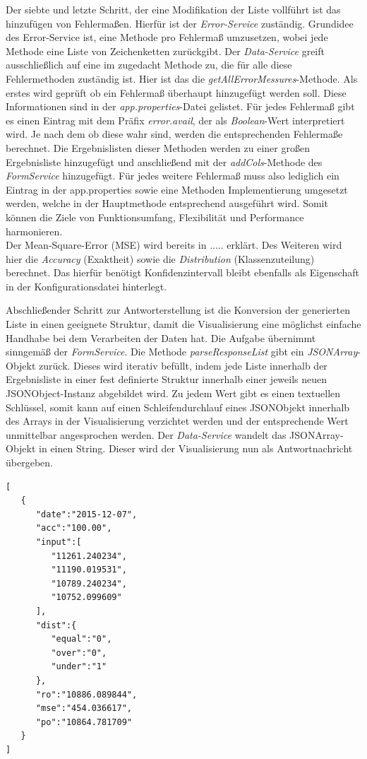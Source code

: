 Der siebte und letzte Schritt, der eine Modifikation der Liste vollführt ist das hinzufügen von Fehlermaßen. Hierfür ist der \emph{Error-Service} zuständig. Grundidee des Error-Service ist, eine Methode pro Fehlermaß umzusetzen, wobei jede Methode eine Liste von Zeichenketten zurückgibt. Der \emph{Data-Service} greift ausschließlich auf eine im zugedacht Methode zu, die für alle diese Fehlermethoden zuständig ist. Hier ist das die \emph{getAllErrorMessures}-Methode. Als erstes wird geprüft ob ein Fehlermaß überhaupt hinzugefügt werden soll. Diese Informationen sind in der \emph{app.properties}-Datei gelistet. Für jedes Fehlermaß gibt es einen Eintrag mit dem Präfix \emph{error.avail}, der als \emph{Boolean}-Wert interpretiert wird. Je nach dem ob diese wahr sind, werden die entsprechenden Fehlermaße berechnet. Die Ergebnislisten dieser Methoden werden zu einer großen Ergebnisliste hinzugefügt und anschließend mit der \emph{addCols}-Methode des \emph{FormService} hinzugefügt.
Für jedes weitere Fehlermaß muss also lediglich ein Eintrag in der app.properties sowie eine Methoden Implementierung umgesetzt werden, welche in der Hauptmethode entsprechend ausgeführt wird. Somit können die Ziele von Funktionsumfang, Flexibilität und Performance harmonieren.\\
Der Mean-Square-Error (MSE) wird bereits in ..... erklärt. Des Weiteren wird hier die \emph{Accuracy} (Exaktheit) sowie die \emph{Distribution} (Klassenzuteilung) berechnet. Das hierfür benötigt Konfidenzintervall bleibt ebenfalls als Eigenschaft in der Konfigurationsdatei hinterlegt. 

Abschließender Schritt zur Antworterstellung ist die Konversion der generierten Liste in einen geeignete Struktur, damit die Visualisierung eine möglichst einfache Handhabe bei dem Verarbeiten der Daten hat. Die Aufgabe übernimmt sinngemäß der \emph{FormService}. Die Methode \emph{parseResponseList} gibt ein \emph{JSONArray}-Objekt zurück. Dieses wird iterativ befüllt, indem jede Liste innerhalb der Ergebnisliste in einer fest definierte Struktur innerhalb einer jeweils neuen JSONObject-Instanz abgebildet wird. Zu jedem Wert gibt es einen textuellen Schlüssel, somit kann auf einen Schleifendurchlauf eines JSONObjekt innerhalb des Arrays in der Visualisierung verzichtet werden und der entsprechende Wert unmittelbar angesprochen werden. Der \emph{Data-Service} wandelt das JSONArray-Objekt in einen String. Dieser wird der Visualisierung nun als Antwortnachricht übergeben. 


\begin{lstlisting}[basicstyle=\scriptsize, caption=Beispiel - JSONArray]
[  
   {  
      "date":"2015-12-07",
      "acc":"100.00",
      "input":[  
         "11261.240234",
         "11190.019531",
         "10789.240234",
         "10752.099609"
      ],
      "dist":{  
         "equal":"0",
         "over":"0",
         "under":"1"
      },
      "ro":"10886.089844",
      "mse":"454.036617",
      "po":"10864.781709"
   }
]
\end{lstlisting}



